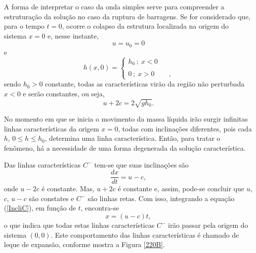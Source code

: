 A forma de interpretar o caso da onda simples serve para compreender a estruturação da solução no caso da ruptura de barragens. Se for considerado que, para o tempo $t=0$, ocorre o colapso da estrutura localizada na origem do sistema $x=0$ e, nesse instante, 
\begin{equation*}
u= u_0 =0
\end{equation*}
e
\begin{equation*}
h(x, 0) = \left\{
	\begin{array}{rcl}
	h_0 \ ; \ x<0 &  & \\
	& & \\
	0 \ ; \ x>0 &  &, 
	\end{array} \right.
\end{equation*}
sendo $h_0>0$  constante, todas as características virão da região não perturbada $x<0$ e serão constantes, ou seja, 
\begin{equation*}
u+2c=2 \sqrt{gh_0}.
\end{equation*}

No momento em que se inicia o movimento da massa líquida irão surgir infinitas linhas características da origem $x=0$, todas com inclinações diferentes, pois cada $h$, $0 \leq h \leq h_0$, determina uma linha característica. Então, para tratar o fenômeno, há a necessidade de uma forma degenerada da solução característica.

Das linhas características $C^-$ tem-se que suas inclinações são
\begin{equation}\label{IncliC}
\frac{dx}{dt} = u-c,
\end{equation}
onde $u-2c$ é constante. Mas, $u+2c$ é constante e, assim, pode-se concluir que $u$, $c$, $u-c$ são constates e $C^-$ são linhas retas. Com isso, integrando a equação (\ref{IncliC}), em função de $t$, encontra-se
\begin{equation}\label{IntC}
x= (u-c)t,
\end{equation}
o que indica que todas estas linhas características $C^-$ irão passar pela origem do sistema $(0,0)$. Este comportamento das linhas características é chamado de leque de expansão, conforme mostra a Figura \ref{220B}.

